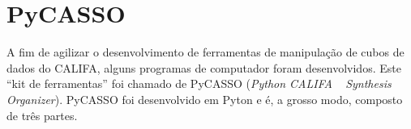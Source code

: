 


\chapter{PyCASSO}
\label{sec:pycasso}



A fim de agilizar o desenvolvimento de ferramentas de manipulação de cubos de
dados do CALIFA, alguns programas de computador foram desenvolvidos. Este ``kit
de ferramentas'' foi chamado de PyCASSO ({\em Python CALIFA} \starlight\ {\em
Synthesis Organizer}). PyCASSO foi desenvolvido em Pyton e é, a grosso modo,
composto de três partes.

